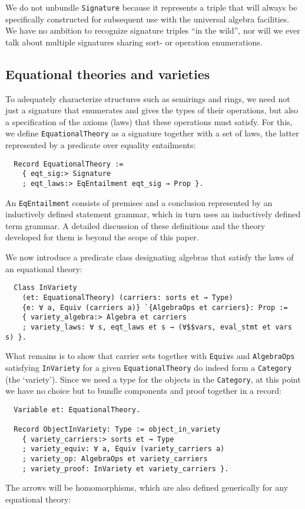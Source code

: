 \documentclass[a4paper,10pt,runningheads]{llncs}
\begin{document}
We do not unbundle \lstinline|Signature| because it represents a triple that will always be specifically constructed for subsequent use with the universal algebra facilities. We have no ambition to recognize signature triples ``in the wild'', nor will we ever talk about multiple signatures sharing sort- or operation enumerations.

\subsection{Equational theories and varieties}
\label{varieties}

To adequately characterize structures such as semirings and rings, we need not just a signature that enumerates and gives the types of their operations, but also a specification of the axioms (laws) that these operations must satisfy. For this, we define \lstinline|EquationalTheory| as a signature together with a set of laws, the latter represented by a predicate over equality entailments:
\begin{lstlisting}
  Record EquationalTheory :=
    { eqt_sig:> Signature
    ; eqt_laws:> EqEntailment eqt_sig → Prop }.
\end{lstlisting}
An \lstinline|EqEntailment| consists of premises and a conclusion represented by an inductively defined statement grammar, which in turn uses an inductively defined term grammar. A detailed discussion of these definitions and the theory developed for them is beyond the scope of this paper.

We now introduce a predicate class designating algebras that satisfy the laws of an equational theory:
\begin{lstlisting}
  Class InVariety
    (et: EquationalTheory) (carriers: sorts et → Type)
    {e: ∀ a, Equiv (carriers a)} `{AlgebraOps et carriers}: Prop :=
    { variety_algebra:> Algebra et carriers
    ; variety_laws: ∀ s, eqt_laws et s → (∀$$vars, eval_stmt et vars s) }.
\end{lstlisting}

What remains is to show that carrier sets together with \lstinline|Equiv|s and \lstinline|AlgebraOps| satisfying \lstinline|InVariety| for a given \lstinline|EquationalTheory| do indeed form a \lstinline|Category| (the `variety'). Since we need a type for the objects in the \lstinline|Category|, at this point we have no choice but to bundle components and proof together in a record:
\begin{lstlisting}
  Variable et: EquationalTheory.

  Record ObjectInVariety: Type := object_in_variety
    { variety_carriers:> sorts et → Type
    ; variety_equiv: ∀ a, Equiv (variety_carriers a)
    ; variety_op: AlgebraOps et variety_carriers
    ; variety_proof: InVariety et variety_carriers }.
\end{lstlisting}
The arrows will be homomorphisms, which are also defined generically for any equational theory:
\end{document}
